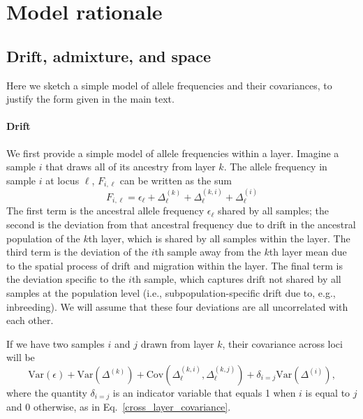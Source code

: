 \documentclass[10pt,letterpaper]{article}
\begin{document}


\section*{Model rationale}
\subsection*{Drift, admixture, and space} \label{rationale}
Here we sketch a simple model of allele frequencies and their
covariances, to justify the form given in the main text.
\paragraph{Drift} 
We first provide a simple model of allele frequencies within a layer. 
Imagine a sample $i$ that draws all of its ancestry from layer $k$.
The allele frequency in sample $i$ at locus $\ell$, $F_{i,\ell}$ can be
written as the sum
\begin{equation}
F_{i,\ell} = \epsilon_{\ell} + \Delta^{(k)}_{\ell} +
\Delta^{(k,i)}_{\ell} + \Delta^{(i)}_{\ell}
\label{drift_terms_no_admix}
\end{equation}
The first term is the ancestral allele frequency $\epsilon_\ell$ shared by all samples; 
the second is the deviation from that ancestral frequency 
due to drift in the ancestral population of the $k$th layer,
which is shared by all samples within the layer. 
The third term is the deviation of the $i$th sample away from the $k$th layer mean 
due to the spatial process of drift and migration within the layer.
The final term is the deviation specific to the $i$th sample,
which captures drift not shared by all samples at the population level
(i.e., subpopulation-specific drift due to, e.g., inbreeding). 
We will assume that these four deviations are all uncorrelated with each other.

If we have two samples $i$ and $j$ drawn from layer $k$, 
their covariance across loci will be 
\begin{equation}
\text{Var}(\epsilon) +  \text{Var}\left( \Delta^{(k)} \right) +
\text{Cov}(\Delta^{(k,i)}_{\ell},\Delta^{(k,j)}_{\ell}) + \delta_{i=j} \text{Var}\left( \Delta^{(i)} \right),
\end{equation}
where the quantity $\delta_{i=j}$ is an indicator variable that equals 1 when $i$ is equal to $j$ and 0 otherwise, 
as in Eq.\ \eqref{cross_layer_covariance}.
\end{document}
